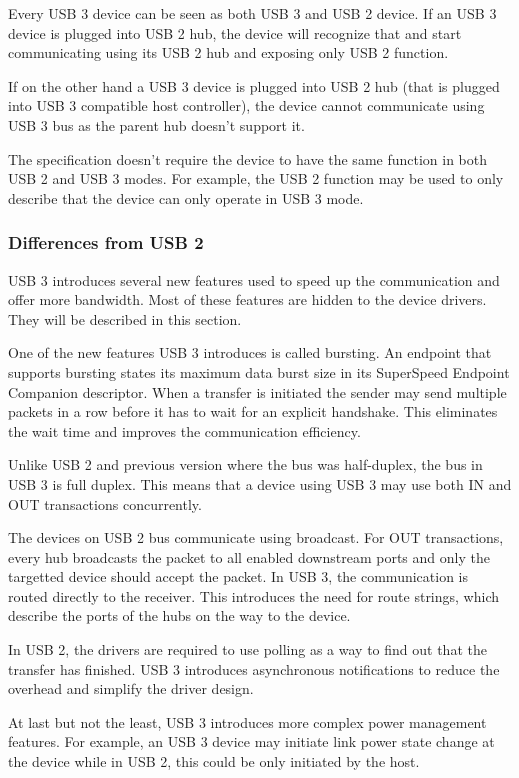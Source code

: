 Every USB 3 device can be seen as both USB 3 and USB 2 device. If an USB 3
device is plugged into USB 2 hub, the device will recognize that and start
communicating using its USB 2 hub and exposing only USB 2 function.

If on the other hand a USB 3 device is plugged into USB 2 hub (that is plugged
into USB 3 compatible host controller), the device cannot communicate using USB
3 bus as the parent hub doesn't support it.

The specification doesn't require the device to have the same function in both
USB 2 and USB 3 modes. For example, the USB 2 function may be used to only
describe that the device can only operate in USB 3 mode.

\subsubsection{Differences from USB 2}

USB 3 introduces several new features used to speed up the communication and
offer more bandwidth. Most of these features are hidden to the device drivers.
They will be described in this section.

One of the new features USB 3 introduces is called bursting. An endpoint that
supports bursting states its maximum data burst size in its SuperSpeed Endpoint
Companion descriptor. When a transfer is initiated the sender may send multiple
packets in a row before it has to wait for an explicit handshake. This
eliminates the wait time and improves the communication efficiency.

Unlike USB 2 and previous version where the bus was half-duplex, the bus in USB
3 is full duplex. This means that a device using USB 3 may use both IN and OUT
transactions concurrently.

The devices on USB 2 bus communicate using broadcast. For OUT transactions,
every hub broadcasts the packet to all enabled downstream ports and only the
targetted device should accept the packet. In USB 3, the communication is
routed directly to the receiver. This introduces the need for route strings,
which describe the ports of the hubs on the way to the device.

In USB 2, the drivers are required to use polling as a way to find out that the
transfer has finished. USB 3 introduces asynchronous notifications to reduce
the overhead and simplify the driver design.

At last but not the least, USB 3 introduces more complex power management
features. For example, an USB 3 device may initiate link power state change at
the device while in USB 2, this could be only initiated by the host.
